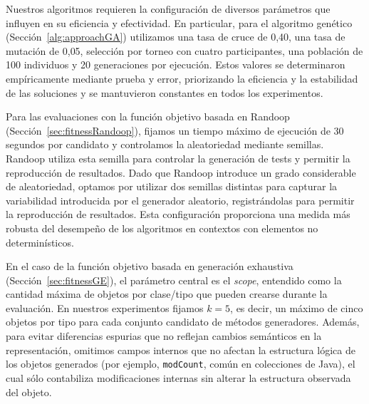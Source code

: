 
Nuestros algoritmos requieren la configuración de diversos parámetros que influyen en su eficiencia y efectividad.
En particular, para el algoritmo genético (Sección~\ref{alg:approachGA}) utilizamos una tasa de cruce de 0{,}40, una tasa de mutación de 0{,}05, 
selección por torneo con cuatro participantes, una población de 100 individuos y 20 generaciones por ejecución. 
Estos valores se determinaron empíricamente mediante prueba y error, priorizando la eficiencia y la estabilidad de las soluciones y se mantuvieron constantes en todos los experimentos.

Para las evaluaciones con la función objetivo basada en Randoop (Sección~\ref{sec:fitnessRandoop}), 
fijamos un tiempo máximo de ejecución de 30 segundos por candidato 
y controlamos la aleatoriedad mediante semillas. Randoop utiliza esta semilla para controlar la generación de tests y
permitir la reproducción de resultados. Dado que Randoop introduce un grado
considerable de aleatoriedad, optamos por utilizar dos semillas distintas para capturar la variabilidad introducida por el 
generador aleatorio, registrándolas para permitir la reproducción de resultados. 
Esta configuración proporciona una medida más robusta del desempeño de los algoritmos en contextos con 
elementos no determin\'isticos.

En el caso de la función objetivo basada en generación exhaustiva (Sección~\ref{sec:fitnessGE}),
el parámetro central es el \emph{scope}, entendido como la cantidad máxima de objetos por clase/tipo que pueden crearse durante la evaluación.
En nuestros experimentos fijamos \(k=5\), es decir, un máximo de cinco objetos por tipo para cada conjunto candidato de métodos generadores. 
Además, para evitar diferencias espurias que no reflejan cambios semánticos en la representación, 
omitimos campos internos que no afectan la estructura lógica de los objetos generados (por ejemplo, \texttt{modCount}, común en colecciones de Java), 
el cual sólo contabiliza modificaciones internas sin alterar la estructura observada del objeto.  

